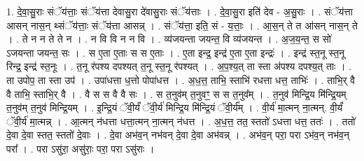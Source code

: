 \documentclass[17pt]{extarticle}
\begin{document}
1. दे॒वा॒सु॒राः संॅय॑त्ताः॒ संॅय॑त्ता देवासु॒रा दे॑वासु॒राः संॅय॑त्ताः । . दे॒वा॒सु॒रा इति॑ देव - अ॒सु॒राः । . संॅय॑त्ता आसन् नास॒न् थ्संॅय॑त्ताः॒ संॅय॑त्ता आसन्न् । . संॅय॑त्ता॒ इति॒ सं - य॒त्ताः॒ । . आ॒स॒न् ते त आ॑सन् नास॒न् ते । . ते न न ते ते न । . न वि वि न न वि । . व्य॑जयन्ता जयन्त॒ वि व्य॑जयन्त । . अ॒ज॒य॒न्त॒ स सो॑ ऽजयन्ता जयन्त॒ सः । . स ए॒ता ए॒ताः स स ए॒ताः । . ए॒ता इन्द्र॒ इन्द्र॑ ए॒ता ए॒ता इन्द्रः॑ । . इन्द्र॑ स्त॒नू स्त॒नू रिन्द्र॒ इन्द्र॑ स्त॒नूः । . त॒नू र॑पश्य दपश्यत् त॒नू स्त॒नू र॑पश्यत् । . अ॒प॒श्य॒त् ता स्ता अ॑पश्य दपश्य॒त् ताः । . ता उपोप॒ ता स्ता उप॑ । . उपा॑धत्ता ध॒त्तो पोपा॑धत्त । . अ॒ध॒त्त॒ ताभि॒ स्ताभि॑ रधत्ता धत्त॒ ताभिः॑ । . ताभि॒र् वै वै ताभि॒ स्ताभि॒र् वै । . वै स स वै वै सः । . स त॒नुव॑म् त॒नुवꣳ॒॒ स स त॒नुव᳚म् । . त॒नुव॑ मिन्द्रि॒य मि॑न्द्रि॒यम् त॒नुव॑म् त॒नुव॑ मिन्द्रि॒यम् । . इ॒न्द्रि॒यं ॅवी॒र्यं॑ ॅवी॒र्य॑ मिन्द्रि॒य मि॑न्द्रि॒यं ॅवी॒र्य᳚म् । . वी॒र्य॑ मा॒त्मन् ना॒त्मन्. वी॒र्यं॑ ॅवी॒र्य॑ मा॒त्मन्न् । . आ॒त्मन् न॑धत्ता धत्ता॒त्मन् ना॒त्मन् न॑धत्त । . अ॒ध॒त्त॒ तत॒ स्ततो॑ ऽधत्ता धत्त॒ ततः॑ । . ततो॑ दे॒वा दे॒वा स्तत॒ स्ततो॑ दे॒वाः । . दे॒वा अभ॑व॒न् नभ॑वन् दे॒वा दे॒वा अभ॑वन्न् । . अभ॑व॒न् परा॒ परा ऽभ॑व॒न् नभ॑व॒न् परा᳚ । . परा ऽसु॑रा॒ असु॑राः॒ परा॒ परा ऽसु॑राः । \newline
\end{document}
